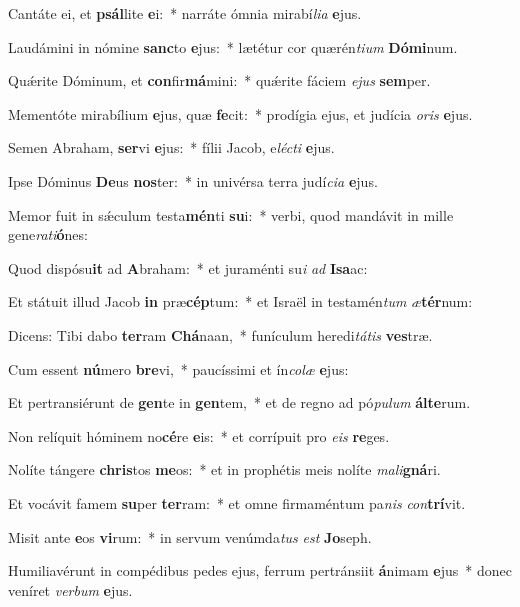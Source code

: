 \item Cantáte ei, et \textbf{psál}lite \textbf{e}i:~* narráte ómnia mirabí\textit{li}\textit{a} \textbf{e}jus.
\item Laudámini in nómine \textbf{sanc}to \textbf{e}jus:~* lætétur cor quærén\textit{ti}\textit{um} \textbf{Dó}\textbf{mi}num.
\item Quǽrite Dóminum, et \textbf{con}fir\textbf{má}mini:~* quǽrite fáciem \textit{e}\textit{jus} \textbf{sem}per.
\item Mementóte mirabílium \textbf{e}jus, quæ \textbf{fe}cit:~* prodígia ejus, et judícia \textit{o}\textit{ris} \textbf{e}jus.
\item Semen Abraham, \textbf{ser}vi \textbf{e}jus:~* fílii Jacob, e\textit{léc}\textit{ti} \textbf{e}jus.
\item Ipse Dóminus \textbf{De}us \textbf{nos}ter:~* in univérsa terra judí\textit{ci}\textit{a} \textbf{e}jus.
\item Memor fuit in sǽculum testa\textbf{mén}ti \textbf{su}i:~* verbi, quod mandávit in mille gene\textit{ra}\textit{ti}\textbf{ó}nes:
\item Quod dispósu\textbf{it} ad \textbf{A}braham:~* et juraménti su\textit{i} \textit{ad} \textbf{I}\textbf{sa}ac:
\item Et státuit illud Jacob \textbf{in} præ\textbf{cép}tum:~* et Israël in testamén\textit{tum} \textit{æ}\textbf{tér}num:
\item Dicens: Tibi dabo \textbf{ter}ram \textbf{Chá}naan,~* funículum heredi\textit{tá}\textit{tis} \textbf{ves}træ.
\item Cum essent \textbf{nú}mero \textbf{bre}vi,~* paucíssimi et ín\textit{co}\textit{læ} \textbf{e}jus:
\item Et pertransiérunt de \textbf{gen}te in \textbf{gen}tem,~* et de regno ad pó\textit{pu}\textit{lum} \textbf{ál}\textbf{te}rum.
\item Non relíquit hóminem no\textbf{cé}re \textbf{e}is:~* et corrípuit pro \textit{e}\textit{is} \textbf{re}ges.
\item Nolíte tángere \textbf{chris}tos \textbf{me}os:~* et in prophétis meis nolíte \textit{ma}\textit{li}\textbf{gná}ri.
\item Et vocávit famem \textbf{su}per \textbf{ter}ram:~* et omne firmaméntum pa\textit{nis} \textit{con}\textbf{trí}vit.
\item Misit ante \textbf{e}os \textbf{vi}rum:~* in servum venúmda\textit{tus} \textit{est} \textbf{Jo}seph.
\item Humiliavérunt in compédibus pedes ejus, ferrum pertránsiit \textbf{á}nimam \textbf{e}jus~* donec veníret \textit{ver}\textit{bum} \textbf{e}jus.
